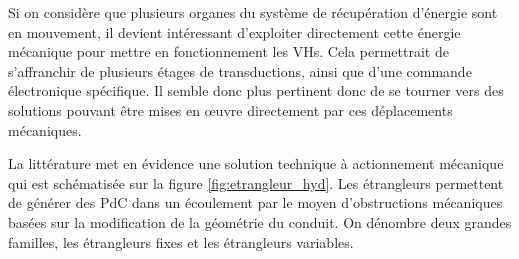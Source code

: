 Si on considère que plusieurs organes du système de récupération d'énergie sont en mouvement, il devient intéressant d'exploiter directement cette énergie mécanique pour mettre en fonctionnement les VHs. Cela permettrait de s'affranchir de plusieurs étages de transductions, ainsi que d'une commande électronique spécifique. Il semble donc plus pertinent donc de se tourner vers des solutions pouvant être mises en \oe{}uvre directement par ces déplacements mécaniques.

La littérature met en évidence une solution technique à actionnement mécanique qui est schématisée sur la figure \ref{fig:etrangleur_hyd}. Les étrangleurs permettent de générer des PdC dans un écoulement par le moyen d'obstructions mécaniques basées sur la modification de la géométrie du conduit. On dénombre deux grandes familles, les étrangleurs fixes et les étrangleurs variables.

